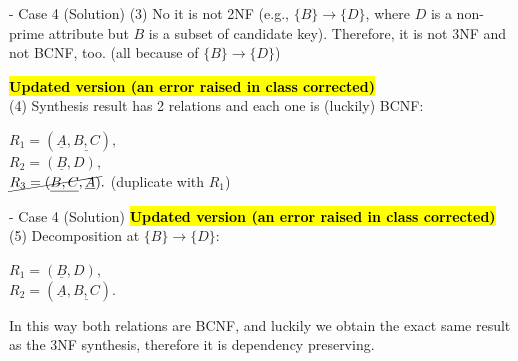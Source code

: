 \begin{frame}[fragile]{ - Case 4 (Solution)}
	(3) No it is not 2NF (e.g., $\{B\} \rightarrow \{D\}$, where $D$ is a non-prime attribute but $B$ is a subset of candidate key). Therefore, it is not 3NF and not BCNF, too. (all because of $\{B\} \rightarrow \{D\}$)\\\vspace{5pt}
	
	
	\textcolor{red}{\textbf{\hl{Updated version (an error raised in class corrected)}}}\\
	(4) Synthesis result has 2 relations and each one is (luckily) BCNF: \\\vspace{5pt}
	
	$R_1 = (\underline{A}, \underline{B, C}),$\\\vspace{2pt}
	$R_2 = (\underline{B}, D),$\\\vspace{1pt}
	$\cancel{R_3 = (\underline{B, C}, \underline{A})}.$ (duplicate with $R_1$)\\\vspace{5pt}
	
\end{frame}

\begin{frame}[fragile]{ - Case 4 (Solution)}
	\textcolor{red}{\textbf{\hl{Updated version (an error raised in class corrected)}}}\\
	(5) Decomposition at $\{B\} \rightarrow \{D\}$:\\\vspace{5pt}
	
	$R_1 = (\underline{B}, D),$\\
	$R_2 = (\underline{A}, \underline{B, C}).$\\\vspace{5pt}
	
	In this way both relations are BCNF, and luckily we obtain the exact same result as the 3NF synthesis, therefore it is dependency preserving.\\\vspace{5pt}
	
\end{frame}

